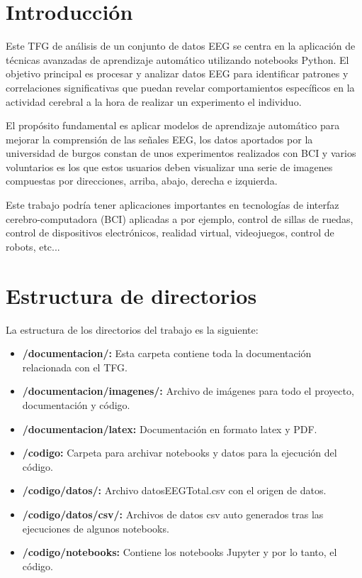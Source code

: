 
\section{Introducción}

Este TFG de análisis de un conjunto de datos EEG se centra en la aplicación de técnicas avanzadas de aprendizaje automático utilizando notebooks Python. El objetivo principal es procesar y analizar datos EEG para identificar patrones y correlaciones significativas que puedan revelar comportamientos específicos en la actividad cerebral a la hora de realizar un experimento el individuo.

El propósito fundamental es aplicar modelos de aprendizaje automático para mejorar la comprensión de las señales EEG, los datos aportados por la universidad de burgos constan de unos experimentos realizados con BCI y varios voluntarios es los que estos usuarios deben visualizar una serie de imagenes compuestas por direcciones, arriba, abajo, derecha e izquierda.

Este trabajo podría tener aplicaciones importantes en tecnologías de interfaz cerebro-computadora (BCI) aplicadas a por ejemplo,  control de sillas de ruedas, control de dispositivos electrónicos, realidad virtual, videojuegos, control de robots, etc...


\section{Estructura de directorios}

La estructura de los directorios del trabajo es la siguiente:

  \begin{itemize}
  \tightlist
  \item
   \textbf{/documentacion/:} Esta carpeta contiene toda la documentación relacionada con el TFG.
  \item
   \textbf{/documentacion/imagenes/:} Archivo de imágenes para todo el proyecto, documentación y código.
  \item
   \textbf{/documentacion/latex:} Documentación en formato latex y PDF.
  \item
   \textbf{/codigo:} Carpeta para archivar notebooks y datos para la ejecución del código.
  \item
   \textbf{/codigo/datos/:} Archivo datosEEGTotal.csv con el origen de datos.
  \item
   \textbf{/codigo/datos/csv/:} Archivos de datos csv auto generados tras las ejecuciones de algunos notebooks.
  \item
   \textbf{/codigo/notebooks:} Contiene los notebooks Jupyter y por lo tanto, el código.
  \end{itemize} 
  
